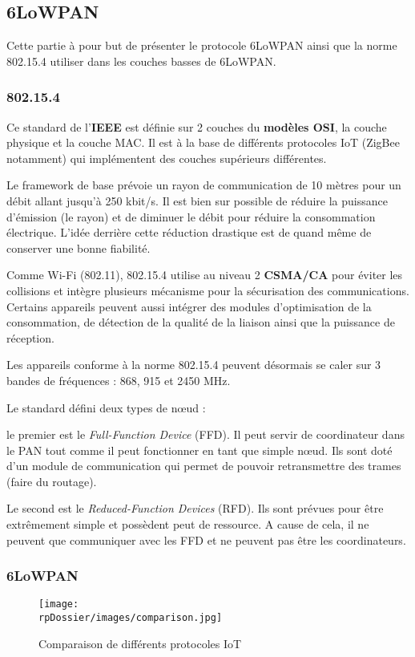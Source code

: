 
\subsection{6LoWPAN}

Cette partie à pour but de présenter le protocole 6LoWPAN ainsi que la norme 802.15.4 utiliser dans les couches basses de 6LoWPAN.

\subsubsection{802.15.4}

Ce standard de l'\textbf{IEEE} est définie sur 2 couches du \textbf{modèles OSI}, la couche physique et la couche MAC. Il est à la base de différents protocoles IoT (ZigBee notamment) qui implémentent des couches supérieurs différentes. 

Le framework de base prévoie un rayon de communication de 10 mètres pour un débit allant jusqu'à 250 kbit/s. Il est bien sur possible de réduire la puissance d'émission (le rayon) et de diminuer le débit pour réduire la consommation électrique. L'idée derrière cette réduction drastique est de quand même de conserver une bonne fiabilité.

Comme Wi-Fi (802.11), 802.15.4 utilise au niveau 2 \textbf{CSMA/CA} pour éviter les collisions et intègre plusieurs mécanisme pour la sécurisation des communications. Certains appareils peuvent aussi intégrer des modules d'optimisation de la consommation, de détection de la qualité de la liaison ainsi que la puissance de réception. 

Les appareils conforme à la norme 802.15.4 peuvent désormais se caler sur 3 bandes de fréquences :  868, 915 et 2450 MHz.

Le standard défini deux types de nœud :

le premier est le \textit{Full-Function Device} (FFD). Il peut servir de coordinateur dans le PAN tout comme il peut fonctionner en tant que simple nœud. Ils sont doté d'un module de communication qui permet de pouvoir retransmettre des trames (faire du routage).

Le second est le \textit{Reduced-Function Devices} (RFD). Ils sont prévues pour être extrêmement simple et possèdent peut de ressource. A cause de cela, il ne peuvent que communiquer avec les FFD et ne peuvent pas être les coordinateurs.

\subsubsection{6LoWPAN}



\begin{figure}[h]
\begin{center}
\texttt{[image: \\rpDossier/images/comparison.jpg]}
\end{center}
\caption{Comparaison de différents protocoles IoT}
\label{comparison}
\end{figure}
